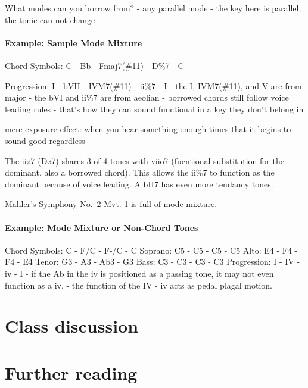 \documentclass{book}
\begin{document}
What modes can you borrow from? - any parallel mode - the key here is
parallel; the tonic can not change

\hypertarget{example-sample-mode-mixture}{%
\subsubsection{Example: Sample Mode
Mixture}\label{example-sample-mode-mixture}}

Chord Symbols: C - Bb - Fmaj7(\#11) - D\%7 - C

Progression: I - bVII - IVM7(\#11) - ii\%7 - I - the I, IVM7(\#11), and V are
from major - the bVI and ii\%7 are from aeolian - borrowed chords still follow
voice leading rules - that's how they can sound functional in a key they don't
belong in

mere exposure effect: when you hear something enough times that it begins to
sound good regardless

The iiø7 (Dø7) shares 3 of 4 tones with viio7 (fucntional substitution for the
dominant, also a borrowed chord). This allows the ii\%7 to function as the
dominant because of voice leading. A bII7 has even more tendancy tones.

Mahler's Symphony No.~2 Mvt. 1 is full of mode mixture.

\hypertarget{example-mode-mixture-or-non-chord-tones}{%
\subsubsection{Example: Mode Mixture or Non-Chord
Tones}\label{example-mode-mixture-or-non-chord-tones}}

Chord Symbols: C - F/C - F-/C - C Soprano: C5 - C5 - C5 - C5 Alto: E4 - F4 -
F4 - E4 Tenor: G3 - A3 - Ab3 - G3 Bass: C3 - C3 - C3 - C3 Progression: I - IV
- iv - I - if the Ab in the iv is positioned as a passing tone, it may not
even function as a iv. - the function of the IV - iv acts as pedal plagal
motion.

\hypertarget{class-discussion-53}{%
\chapter{Class discussion}\label{class-discussion-53}}

\hypertarget{further-reading-28}{%
\chapter{Further reading}\label{further-reading-28}}
\end{document}
